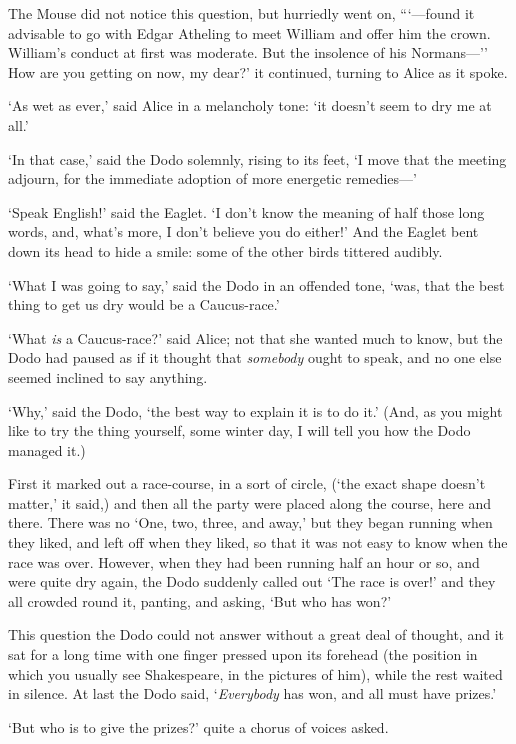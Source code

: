 \documentclass[12pt,openany]{memoir}
\begin{document}
The Mouse did not notice this question, but hurriedly went on, ```---found it advisable to go with Edgar Atheling to meet William and offer him the crown. William's conduct at first was moderate. But the insolence of his Normans---'' How are you getting on now, my dear?' it continued, turning to Alice as it spoke.

`As wet as ever,' said Alice in a melancholy tone: `it doesn't seem to dry me at all.'

`In that case,' said the Dodo solemnly, rising to its feet, `I move that the meeting adjourn, for the immediate adoption of more energetic remedies---'

`Speak English!' said the Eaglet. `I don't know the meaning of half those long words, and, what's more, I don't believe you do either!' And the Eaglet bent down its head to hide a smile: some of the other birds tittered audibly.

`What I was going to say,' said the Dodo in an offended tone, `was, that the best thing to get us dry would be a Caucus-race.'

`What \textit{is} a Caucus-race?' said Alice; not that she wanted much to know, but the Dodo had paused as if it thought that \textit{somebody} ought to speak, and no one else seemed inclined to say anything.

`Why,' said the Dodo, `the best way to explain it is to do it.' (And, as you might like to try the thing yourself, some winter day, I will tell you how the Dodo managed it.)

First it marked out a race-course, in a sort of circle, (`the exact shape doesn't matter,' it said,) and then all the party were placed along the course, here and there. There was no `One, two, three, and away,' but they began running when they liked, and left off when they liked, so that it was not easy to know when the race was over. However, when they had been running half an hour or so, and were quite dry again, the Dodo suddenly called out `The race is over!' and they all crowded round it, panting, and asking, `But who has won?'

This question the Dodo could not answer without a great deal of thought, and it sat for a long time with one finger pressed upon its forehead (the position in which you usually see Shakespeare, in the pictures of him), while the rest waited in silence. At last the Dodo said, `\textit{Everybody} has won, and all must have prizes.'

`But who is to give the prizes?' quite a chorus of voices asked.
\end{document}
